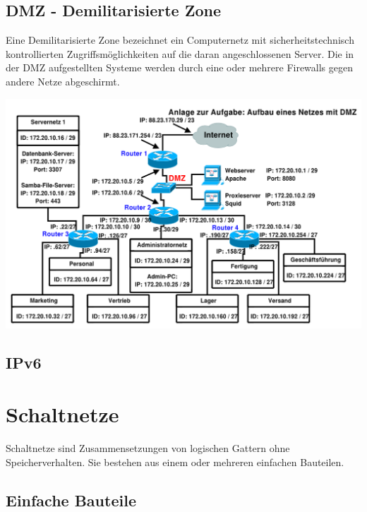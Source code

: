 \documentclass[12pt,a4paper]{article}
\begin{document}
\subsection{DMZ - Demilitarisierte Zone}
    Eine Demilitarisierte Zone bezeichnet ein Computernetz mit sicherheitstechnisch kontrollierten Zugriffsmöglichkeiten auf die daran angeschlossenen Server. Die in der DMZ aufgestellten Systeme werden durch eine oder mehrere Firewalls gegen andere Netze abgeschirmt.
    \begin{center}
        \includegraphics[scale=0.9]{Bilder/DMZ.PNG}
    \end{center}

\subsection{IPv6}


\section{Schaltnetze}
    Schaltnetze sind Zusammensetzungen von logischen Gattern ohne Speicherverhalten. Sie bestehen aus einem oder mehreren einfachen Bauteilen.
    
\subsection{Einfache Bauteile}
\end{document}
